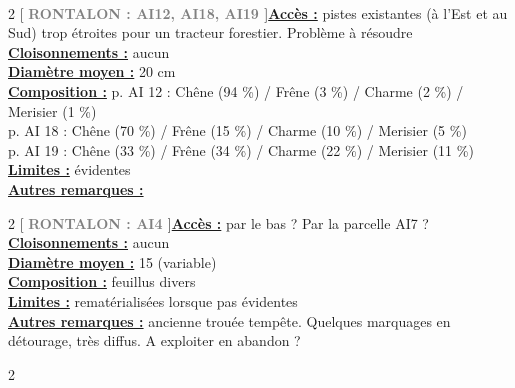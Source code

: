 \documentclass[a4paper,openany]{book}\usepackage[]{graphicx}\usepackage[]{color}
\begin{document}
\\\begin{multicols}{2}
[
\textbf{\textcolor{gray}{
\large RONTALON : AI12, AI18, AI19
}}
]\noindent\textbf{\underline{Accès :}} pistes existantes (à l'Est et au Sud) trop étroites pour un tracteur forestier. Problème à résoudre\vspace{0.1cm} \\\noindent\textbf{\underline{Cloisonnements :}} aucun\vspace{0.1cm} \\\noindent\textbf{\underline{Diamètre moyen :}} 20 cm\vspace{0.1cm} \\\noindent\textbf{\underline{Composition :}} p. AI 12 : Chêne (94 \%) / Frêne (3 \%) / Charme (2 \%) / Merisier (1 \%) \\ p. AI 18 : Chêne (70 \%) / Frêne (15 \%) / Charme (10 \%) / Merisier (5 \%) \\ p. AI 19 : Chêne (33 \%) / Frêne (34 \%) / Charme (22 \%) / Merisier (11 \%)\vspace{0.1cm} \\\noindent\textbf{\underline{Limites :}} évidentes\vspace{0.1cm} \\\noindent\textbf{\underline{Autres remarques :}} \vspace{0.1cm} \\\end{multicols}\begin{multicols}{2}
[
\textbf{\textcolor{gray}{
\large RONTALON : AI4
}}
]\noindent\textbf{\underline{Accès :}} par le bas ? Par la parcelle AI7 ?\vspace{0.1cm} \\\noindent\textbf{\underline{Cloisonnements :}} aucun\vspace{0.1cm} \\\noindent\textbf{\underline{Diamètre moyen :}} 15 (variable)\vspace{0.1cm} \\\noindent\textbf{\underline{Composition :}} feuillus divers\vspace{0.1cm} \\\noindent\textbf{\underline{Limites :}} rematérialisées lorsque pas évidentes\vspace{0.1cm} \\\noindent\textbf{\underline{Autres remarques :}} ancienne trouée tempête. Quelques marquages en détourage, très diffus. A exploiter en abandon ?\vspace{0.1cm} \\\end{multicols}\begin{multicols}{2}

\end{multicols}
\end{document}
